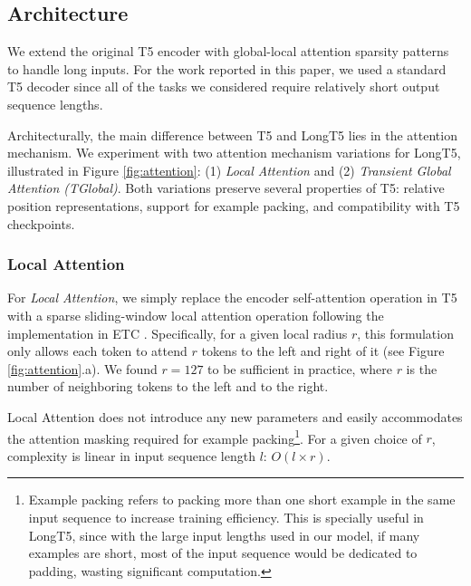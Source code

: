 \subsection{Architecture}
We extend the original T5 encoder with global-local attention sparsity patterns~\cite{etc,bigbird} to handle long inputs. For the work reported in this paper, we used a standard T5 decoder since all of the tasks we considered require relatively short output sequence lengths.

Architecturally, the main difference between T5 and LongT5 lies in the attention mechanism. We experiment with two attention mechanism variations for LongT5, illustrated in Figure \ref{fig:attention}: (1) \emph{Local Attention} and (2) \emph{Transient Global Attention (TGlobal)}.  Both variations preserve several properties of T5: relative position representations, support for example packing, and compatibility with T5 checkpoints.

\subsubsection{Local Attention} For {\em Local Attention}, we simply replace the encoder self-attention operation in T5 with a sparse sliding-window local attention operation following the implementation in ETC \cite{etc}.  Specifically, for a given local radius $r$, this formulation only allows each token to attend $r$ tokens to the left and right of it (see Figure \ref{fig:attention}.a).  We found $r = 127$ to be sufficient in practice, where $r$ is the number of neighboring tokens to the left and to the right. 

Local Attention does not introduce any new parameters and easily accommodates the attention masking required for example packing\footnote{Example packing refers to packing more than one short example in the same input sequence to increase training efficiency. This is specially useful in LongT5, since with the large input lengths used in our model, if many examples are short, most of the input sequence would be dedicated to padding, wasting significant computation.}. For a given choice of $r$, complexity is linear in input sequence length $l$: $O(l \times r)$.

